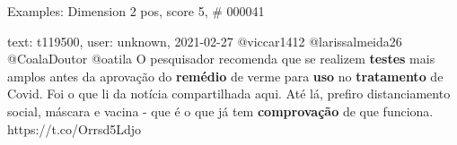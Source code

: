 \begin{frame}{Examples: Dimension 2 pos, score 5, \# 000041}
\footnotesize
\begin{exampleblock}{text: t119500, user: unknown, 2021-02-27}
@viccar1412 @larissalmeida26 @CoalaDoutor @oatila O pesquisador recomenda que 
se realizem \textbf{testes} mais amplos antes da aprovação do \textbf{remédio} 
de verme para \textbf{uso} no \textbf{tratamento} de Covid. Foi o que li da 
notícia compartilhada aqui. Até lá, prefiro distanciamento social, máscara e 
vacina - que é o que já tem \textbf{comprovação} de que funciona. 
https://t.co/Orrsd5Ldjo 
\end{exampleblock}
\end{frame}
